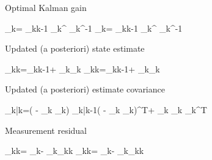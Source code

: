 Optimal Kalman gain

	{\displaystyle {} _{k}= _{k\mid k-1} _{k}^{ } _{k}^{-1}} {\displaystyle {} _{k}= _{k\mid k-1} _{k}^{ } _{k}^{-1}}

Updated (a posteriori) state estimate

	{_{k\mid k}={}_{k\mid k-1}+ _{k}{}_{k}} {}_{k\mid k}={}_{k\mid k-1}+ _{k}{}_{k}

Updated (a posteriori) estimate covariance

	{\displaystyle {} _{k|k}=( - _{k} _{k}) _{k|k-1}( - _{k} _{k})^{T}+ _{k} _{k} _{k}^{T}}
	
Measurement residual

	{_{k\mid k}= _{k}- _{k}{}_{k\mid k}} {_{k\mid k}= _{k}- _{k}{}_{k\mid k}}
\newpage
